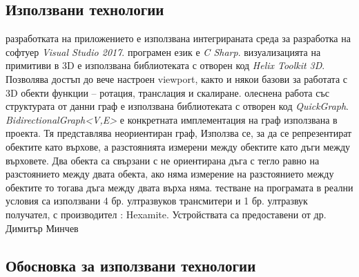 



\subsection{Използвани технологии}
\begin{enumerate}
  разработката на приложението е използвана интегрираната среда за разработка на софтуер \textit{Visual Studio 2017}. 
  програмен език е \textit{C Sharp}. 
  визуализацията на примитиви в 3D е използвана библиотеката с отворен код \textit{Helix Toolkit 3D}. Позволява достъп до вече настроен viewport, както и някои базови за работата с 3D обекти функции – ротация, транслация и скалиране.
  олеснена работа със структурата от данни граф е използвана библиотеката с отворен код \textit{QuickGraph}. \textit{BidirectionalGraph<V,E>} е конкретната имплементация на граф използвана в проекта.  Тя представлява неориентиран граф, Използва се, за да се репрезентират обектите като върхове, а разстоянията измерени между обектите като дъги между върховете. Два обекта са свързани с не ориентирана дъга с тегло равно на разстоянието между двата обекта, ако няма измерение на разстоянието между обектите то тогава дъга между двата върха няма.
  тестване на програмата в реални условия са използвани 4 бр. ултразвуков трансмитери и 1 бр. ултразвук получател, с производител : Hexamite. Устройствата са предоставени от др. Димитър Минчев
\end{enumerate}



\subsection{Обосновка за използвани технологии}

